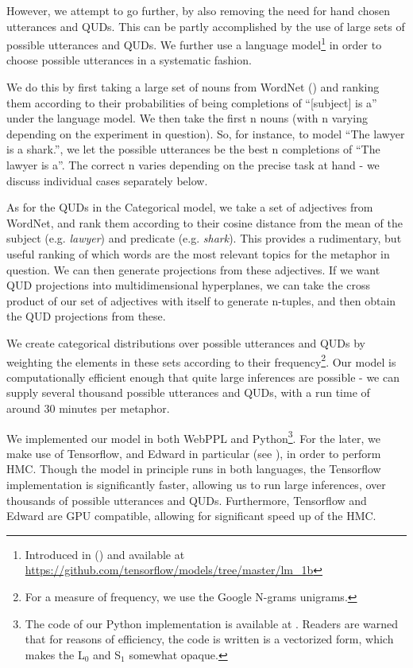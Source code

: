 \documentclass[10pt,letterpaper,twocolumn]{article}
\begin{document}
However, we attempt to go further, by also removing the need for hand chosen utterances and QUDs. This can be partly accomplished by the use of large sets of possible utterances and QUDs. We further use a language model\footnote{Introduced in (\cite{jozefowicz2016exploring}) and available at \url{https://github.com/tensorflow/models/tree/master/lm_1b}} in order to choose possible utterances in a systematic fashion.

We do this by first taking a large set of nouns from WordNet (\cite{miller1995wordnet}) and ranking them according to their probabilities of being completions of ``[subject] is a'' under the language model. We then take the first n nouns (with n varying depending on the experiment in question). So, for instance, to model ``The lawyer is a shark.'', we let the possible utterances be the best n completions of ``The lawyer is a''. The correct n varies depending on the precise task at hand - we discuss individual cases separately below. 

As for the QUDs in the Categorical model, we take a set of adjectives from WordNet, and rank them according to their cosine distance from the mean of the subject (e.g. \emph{lawyer}) and predicate (e.g. \emph{shark}). This provides a rudimentary, but useful ranking of which words are the most relevant topics for the metaphor in question. We can then generate projections from these adjectives. If we want QUD projections into multidimensional hyperplanes, we can take the cross product of our set of adjectives with itself to generate n-tuples, and then obtain the QUD projections from these.

We create categorical distributions over possible utterances and QUDs by weighting the elements in these sets according to their frequency\footnote{For a measure of frequency, we use the Google N-grams unigrams.}. Our model is computationally efficient enough that quite large inferences are possible - we can supply several thousand possible utterances and QUDs, with a run time of around 30 minutes per metaphor. 


We implemented our model in both WebPPL and Python\footnote{The code of our Python implementation is available at \url{}. Readers are warned that for reasons of efficiency, the code is written is a vectorized form, which makes the L$_0$ and S$_1$ somewhat opaque.}. For the later, we make use of Tensorflow, and Edward in particular (see \cite{edward}), in order to perform HMC. Though the model in principle runs in both languages, the Tensorflow implementation is significantly faster, allowing us to run large inferences, over thousands of possible utterances and QUDs. Furthermore, Tensorflow and Edward are GPU compatible, allowing for significant speed up of the HMC.
\end{document}
